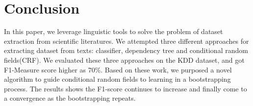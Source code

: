 \documentclass[10pt]{article}
\begin{document}
\section{Conclusion}
In this paper, we leverage linguistic tools to solve the problem of dataset extraction from scientific literatures. We attempted three different approaches for extracting dataset from texts: classifier, dependency tree and conditional random fields(CRF). We evaluated these three approaches on the KDD dataset, and got F1-Measure score higher as 70\%. Based on these work, we purposed a novel algorithm to guide conditional random fields to learning in a bootstrapping process. The results shows the F1-score continues to increase and finally come to a convergence as the bootstrapping repeats.



\end{document}
